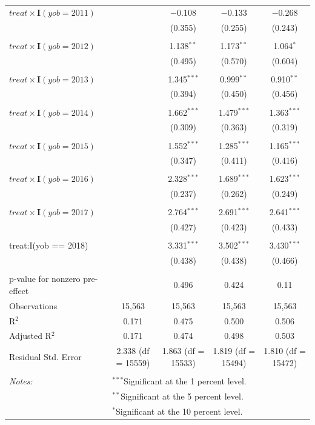 \begin{table}[H]
\begin{tabular}{@{\extracolsep{5pt}}lcccc}
 $treat \times\mathbf{I}(yob = 2011)$ &  & $-$0.108 & $-$0.133 & $-$0.268 \\ 
  &  & (0.355) & (0.255) & (0.243) \\ 
  & & & & \\ 
 $treat \times\mathbf{I}(yob = 2012)$ &  & 1.138$^{**}$ & 1.173$^{**}$ & 1.064$^{*}$ \\ 
  &  & (0.495) & (0.570) & (0.604) \\ 
  & & & & \\ 
 $treat \times\mathbf{I}(yob = 2013)$ &  & 1.345$^{***}$ & 0.999$^{**}$ & 0.910$^{**}$ \\ 
  &  & (0.394) & (0.450) & (0.456) \\ 
  & & & & \\ 
 $treat \times\mathbf{I}(yob = 2014)$ &  & 1.662$^{***}$ & 1.479$^{***}$ & 1.363$^{***}$ \\ 
  &  & (0.309) & (0.363) & (0.319) \\ 
  & & & & \\ 
 $treat \times\mathbf{I}(yob = 2015)$ &  & 1.552$^{***}$ & 1.285$^{***}$ & 1.165$^{***}$ \\ 
  &  & (0.347) & (0.411) & (0.416) \\ 
  & & & & \\ 
 $treat \times\mathbf{I}(yob = 2016)$ &  & 2.328$^{***}$ & 1.689$^{***}$ & 1.623$^{***}$ \\ 
  &  & (0.237) & (0.262) & (0.249) \\ 
  & & & & \\ 
 $treat \times\mathbf{I}(yob = 2017)$ &  & 2.764$^{***}$ & 2.691$^{***}$ & 2.641$^{***}$ \\ 
  &  & (0.427) & (0.423) & (0.433) \\ 
  & & & & \\ 
 treat:I(yob == 2018) &  & 3.331$^{***}$ & 3.502$^{***}$ & 3.430$^{***}$ \\ 
  &  & (0.438) & (0.438) & (0.466) \\ 
  & & & & \\ 
p-value for nonzero pre-effect &  & 0.496 & 0.424 & 0.11 \\ 
Observations & 15,563 & 15,563 & 15,563 & 15,563 \\ 
R$^{2}$ & 0.171 & 0.475 & 0.500 & 0.506 \\ 
Adjusted R$^{2}$ & 0.171 & 0.474 & 0.498 & 0.503 \\ 
Residual Std. Error & 2.338 (df = 15559) & 1.863 (df = 15533) & 1.819 (df = 15494) & 1.810 (df = 15472) \\ 
\hline \\[-1.8ex] 
\textit{Notes:} & \multicolumn{4}{l}{$^{***}$Significant at the 1 percent level.} \\ 
 & \multicolumn{4}{l}{$^{**}$Significant at the 5 percent level.} \\ 
 & \multicolumn{4}{l}{$^{*}$Significant at the 10 percent level.} \\ 
\end{tabular} 
\end{table} 
